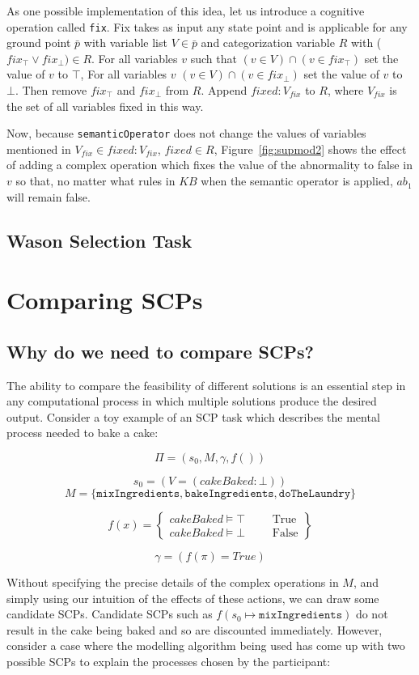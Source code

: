\documentclass[
11pt, %
english, %
singlespacing, %
headsepline, %
]{MastersDoctoralThesis} %
\begin{document}
 As one possible implementation of this idea, let us introduce a cognitive operation called \texttt{fix}. Fix takes as input any state point and is applicable for any ground point $\bar{p}$ with variable list $V \in \bar{p}$ and categorization variable $R$ with ($fix_\top \lor fix_\bot) \in R$. For all variables $v$ such that $(v \in V) \cap (v \in fix_\top)$ set the value of $v$ to $\top$, For all variables $v$ $(v \in V) \cap (v \in fix_\bot)$ set the value of $v$ to $\bot$. Then remove $fix_\top$ and $fix_\bot$ from $R$. Append $fixed:V_{fix}$ to $R$, where $V_{fix}$ is the set of all variables fixed in this way.

Now, because \texttt{semanticOperator} does not change the values of variables mentioned in $V_{fix} \in fixed:V_{fix}$, $fixed \in R$, Figure~\ref{fig:supmod2} shows the effect of adding a complex operation which fixes the value of the abnormality to false in $v$ so that, no matter what rules in $KB$ when the semantic operator is applied, $ab_1$ will remain false.
\section{Wason Selection Task}

\chapter{Comparing SCPs}
\section{Why do we need to compare SCPs?} \label{sec:whyCompare}
The ability to compare the feasibility of different solutions is an essential step in any computational process in which multiple solutions produce the desired output. Consider a toy example of an SCP task which describes the mental process needed to bake a cake:

\[
\Pi = (s_0, M, \gamma, f())
\]

\[
s_0 = (V=(cakeBaked: \bot) )
\]
\[
M=\{\texttt{mixIngredients}, \texttt{bakeIngredients}, \texttt{doTheLaundry}\}
\]

\[
f(x)= \left\{ \begin{split} cakeBaked \models \top & & & \textrm{True}\\ cakeBaked \models \bot & & & \textrm{False} \end{split} \right\}
\]

\[
\gamma = (f(\pi) = True)
\]

Without specifying the precise details of the complex operations in $M$, and simply using our intuition of the effects of these actions, we can draw some candidate SCPs. Candidate SCPs such as $f(s_0 \longmapsto \texttt{mixIngredients})$ do not result in the cake being baked and so are discounted immediately. However, consider a case where the modelling algorithm being used has come up with two possible SCPs to explain the processes chosen by the participant:
\end{document}
